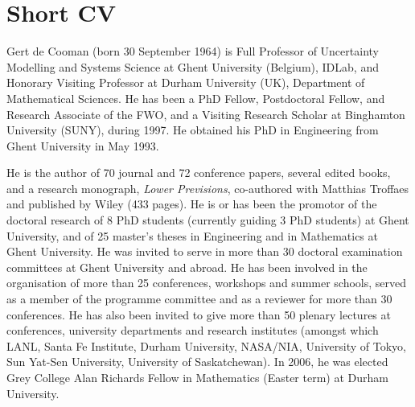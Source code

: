\documentclass[10pt,a4paper,sans]{moderncv}
\begin{document}
\renewcommand*{\cventry}[6]{%
  \cvline{#1}{%
    {\scshape#2}%
    \ifx#3\else{, {\slshape#3}}\fi%
    \ifx#4\else{, #4}\fi%
    \ifx#5\else{, #5}\fi%
    .%
    \ifx#6\else{\newline{}\begin{minipage}[t]{\linewidth}\small#6\end{minipage}}\fi
}}%


\maketitle

\vspace{-30pt}

\section{Short CV}
\vspace{4pt}

Gert de Cooman (born 30 September 1964) is Full Professor of Uncertainty Modelling and Systems Science at Ghent University (Belgium), IDLab, and Honorary Visiting Professor at Durham University (UK), Department of Mathematical Sciences. He has been a PhD Fellow, Postdoctoral Fellow, and Research Associate of the FWO, and a Visiting Research Scholar at Binghamton University (SUNY), during 1997. He obtained his PhD in Engineering from Ghent University in May 1993.

\hspace{10pt}He is the author of 70 journal and 72 conference papers, several edited books, and a research monograph, {\itshape Lower Previsions}, co-authored with Matthias Troffaes and published by Wiley (433 pages). 
He is or has been the promotor of the doctoral research of 8 PhD students (currently guiding 3 PhD students) at Ghent University, and of 25 master’s theses in Engineering and in Mathematics at Ghent University.
He was invited to serve in more than 30 doctoral examination committees at Ghent University and abroad.
He has been involved in the organisation of more than 25 conferences, workshops and summer schools, served as a member of the programme committee and as a reviewer for more than 30 conferences.
He has also been invited to give more than 50 plenary lectures at conferences, university departments and research institutes (amongst which LANL, Santa Fe Institute, Durham University, NASA/NIA, University of Tokyo, Sun Yat-Sen University, University of Saskatchewan).
In 2006, he was elected Grey College Alan Richards Fellow in Mathematics (Easter term) at Durham University.
\end{document}
